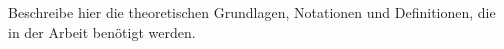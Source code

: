 Beschreibe hier die theoretischen Grundlagen, Notationen und Definitionen, die in der Arbeit benötigt werden.
